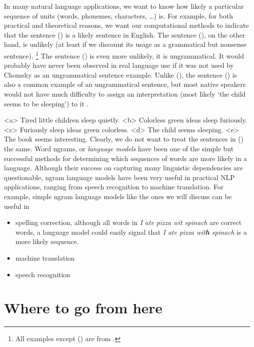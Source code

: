 In many natural language applications,
we want to know how likely a particular sequence of units
(words, phonemes, characters, \ldots) is.
For example,
for both practical and theoretical reasons,
we want our computational methods to indicate that 
the sentence () is a likely sentence in English.
The sentence (),
on the other hand,
is unlikely
(at least if we discount its usage as a grammatical but nonsense sentence).%
\footnote{%
  All examples except () are from
  \textcite{chomsky1957}.
}
The sentence () is even more unlikely,
it is ungrammatical.
It would probably have never been observed in real language use
if it was not used by Chomsky as an ungrammatical sentence example.
Unlike (),
the sentence () is also a common example of
an ungrammatical sentence,
but most native speakers would not have much difficulty to assign
an interpretation (most likely `the child seems to be sleeping') to it
\parencite[p210]{chater2015}.

  \a<a> Tired little children sleep quietly.
  \a<b> Colorless green ideas sleep furiously.
  \a<c>\ljudge{*} Furiously sleep ideas green colorless.
  \a<d>\ljudge{*} The child seems sleeping.
  \a<e> The book seems interesting.
\xe
Clearly,
we do not want to treat the sentences in () the same.
Word ngrams,
or \emph{language models} have been one of the simple but successful methods
for determining which sequences of words are more likely in a language.%
Although their success on capturing
many linguistic dependencies are questionable,
ngram language models have been very useful in practical NLP applications,
ranging from speech recognition to machine translation.
For example,
simple ngram language models like the ones we will discuss can be useful in
\begin{itemize}
  \item spelling correction,
    although all words in \emph{I ate pizza wit spinach}
    are correct words, a language model could easily signal that 
    \emph{I ate pizza wit\textbf{h} spinach} is a more likely sequence.
  \item machine translation
  \item speech recognition
\end{itemize}

\section*{Where to go from here}

